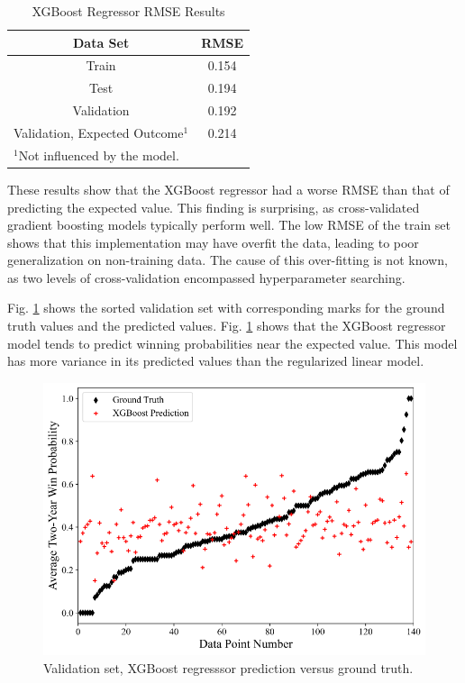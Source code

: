 \documentclass[conference]{IEEEtran}
\begin{document}
\begin{table}[htbp]
\caption{XGBoost Regressor RMSE Results}
\begin{center}
\begin{tabular}{|c||c|}
\hline
\textbf{Data Set} & \textbf{RMSE} \\
\hline
\hline
Train & 0.154 \\
\hline
Test & 0.194 \\
\hline
Validation & 0.192 \\
\hline
Validation, Expected Outcome$^{\mathrm{1}}$ & 0.214 \\
\hline
\multicolumn{2}{l}{$^{\mathrm{1}}$Not influenced by the model.}
\end{tabular}
\label{tab5}
\end{center}
\end{table}

These results show that the XGBoost regressor had a worse RMSE than that of predicting the expected value. This finding is surprising, as cross-validated gradient boosting models typically perform well. The low RMSE of the train set shows that this implementation may have overfit the data, leading to poor generalization on non-training data. The cause of this over-fitting is not known, as two levels of cross-validation encompassed hyperparameter searching.

Fig. \ref{fig6} shows the sorted validation set with corresponding marks for the ground truth values and the predicted values.  Fig. \ref{fig6} shows that the XGBoost regressor model tends to predict winning probabilities near the expected value. This model has more variance in its predicted values than the regularized linear model. 

\begin{figure}[htbp]
\centerline{\includegraphics[width=1\linewidth]{test2.png}}
\caption{Validation set, XGBoost regresssor prediction versus ground truth.}
\label{fig6}
\end{figure}
\end{document}
